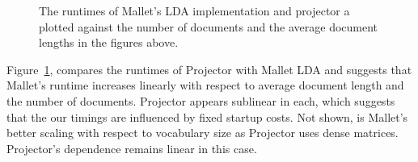 \begin{figure}
\begin{center}

\end{center}
\caption{The runtimes of Mallet's LDA implementation and projector a plotted against
the number of documents and the average document lengths in the figures above. }
\label{fig:time-proj-mallet}
\end{figure}

Figure~\ref{fig:time-proj-mallet}, compares the runtimes of Projector with Mallet
LDA and suggests that Mallet's runtime increases linearly with respect
to average document length and the number of documents.  Projector appears sublinear
in each, which suggests that the our timings are influenced by fixed
startup costs.  Not shown, is Mallet's better scaling with respect
to vocabulary size as Projector uses dense matrices.  Projector's dependence
remains linear in this case. 
